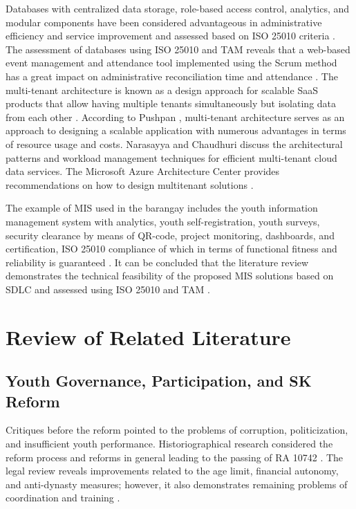 \hspace*{\parindent}Databases with centralized data storage, role-based access control, analytics, and modular components have been considered advantageous in administrative efficiency and service improvement and assessed based on ISO 25010 criteria \cite{A,X,AL}. The assessment of databases using ISO 25010 and TAM reveals that a web-based event management and attendance tool implemented using the Scrum method has a great impact on administrative reconciliation time and attendance \cite{A}. The multi-tenant architecture is known as a design approach for scalable SaaS products that allow having multiple tenants simultaneously but isolating data from each other \cite{AS}. According to Pushpan \cite{AS}, multi-tenant architecture serves as an approach to designing a scalable application with numerous advantages in terms of resource usage and costs. Narasayya and Chaudhuri \cite{AF} discuss the architectural patterns and workload management techniques for efficient multi-tenant cloud data services. The Microsoft Azure Architecture Center provides recommendations on how to design multitenant solutions \cite{AE}.
\vspace{5mm}

\hspace*{\parindent}The example of MIS used in the barangay includes the youth information management system with analytics, youth self-registration, youth surveys, security clearance by means of QR-code, project monitoring, dashboards, and certification, ISO 25010 compliance of which in terms of functional fitness and reliability is guaranteed \cite{E}. It can be concluded that the literature review demonstrates the technical feasibility of the proposed MIS solutions based on SDLC and assessed using ISO 25010 and TAM \cite{A,C,D,E,V,Z,AM,AS}.
\vspace{5mm}

\section{Review of Related Literature}

\subsection{Youth Governance, Participation, and SK Reform}

\hspace*{\parindent}Critiques before the reform pointed to the problems of corruption, politicization, and insufficient youth performance. Historiographical research considered the reform process and reforms in general leading to the passing of RA 10742 \cite{S}. The legal review reveals improvements related to the age limit, financial autonomy, and anti-dynasty measures; however, it also demonstrates remaining problems of coordination and training \cite{S}.
\vspace{5mm}

